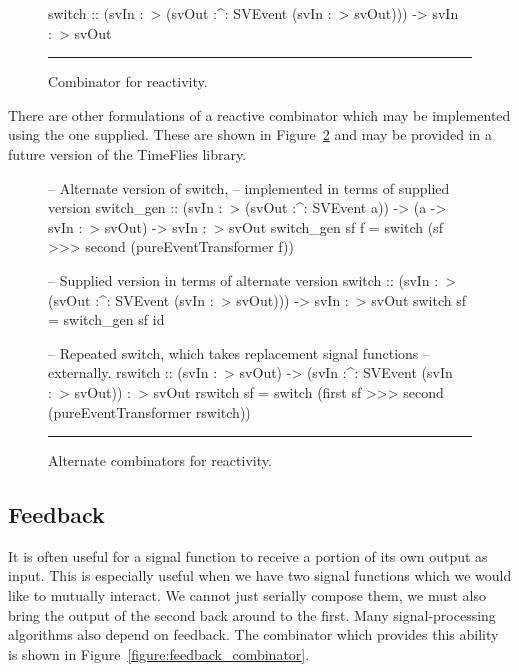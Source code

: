 \begin{figure}
\begin{code}
switch ::    (svIn :~> (svOut :^: SVEvent (svIn :~> svOut)))
          -> svIn :~> svOut
\end{code}
\hrule
\caption{Combinator for reactivity.}
\label{figure:switch_combinator}
\end{figure}

There are other formulations of a reactive combinator which may be implemented
using the one supplied. These are shown in Figure~\ref{figure:alternate_switching_combinators}
and may be provided in a future version of the TimeFlies library.

\begin{figure}
\begin{code}
-- Alternate version of switch,
-- implemented in terms of supplied version
switch_gen ::    (svIn :~> (svOut :^: SVEvent a))
              -> (a -> svIn :~> svOut)
              -> svIn :~> svOut
switch_gen sf f =
  switch (sf >>> second (pureEventTransformer f))

-- Supplied version in terms of alternate version
switch ::    (svIn :~> (svOut :^: SVEvent (svIn :~> svOut)))
          -> svIn :~> svOut
switch sf = switch_gen sf id

-- Repeated switch, which takes replacement signal functions
-- externally.
rswitch ::    (svIn :~> svOut)
           -> (svIn :^: SVEvent (svIn :~> svOut)) :~> svOut
rswitch sf =
  switch (first sf >>> second (pureEventTransformer rswitch))
\end{code}
\hrule
\caption{Alternate combinators for reactivity.}
\label{figure:alternate_switching_combinators}
\end{figure}

\subsection{Feedback}
\label{subsection:System_Design_and_Interface-Combinators-Feedback}

It is often useful for a signal function to receive a portion of its
own output as input. This is especially useful when we have two
signal functions which we would like to mutually interact. We cannot
just serially compose them, we must also bring the output of the second
back around to the first. Many signal-processing algorithms also depend
on feedback. The combinator which provides this ability is shown
in Figure~\ref{figure:feedback_combinator}. 

